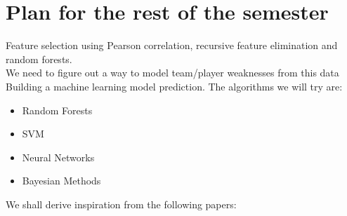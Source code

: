 \documentclass{article}
\begin{document}
\section*{Plan for the rest of the semester}

Feature selection using Pearson correlation, recursive feature elimination and random forests.\\
 We need to figure out a way to model team/player weaknesses from this data\\
Building a machine learning model prediction. The algorithms we will try are:\\
\begin {itemize}

\item Random Forests
\item SVM
\item Neural Networks
\item Bayesian Methods


\end{itemize}


We shall derive inspiration from the following papers\cite{kampakis2015using}\cite{sankaranarayanan2014auto}\cite{kaluarachchi2010cricai}\cite{wiki}:

\renewcommand\refname{Literature Survey}


\end{document}
